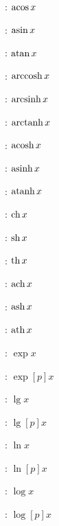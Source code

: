 \documentclass[12pt,a4paper]{article}
\begin{document}
\begin{multicols}{2}
     : $\acos x$

     : $\asin x$

     : $\atan x$

     : $\arccosh x$

     : $\arcsinh x$

     : $\arctanh x$

     : $\acosh x$

     : $\asinh x$

     : $\atanh x$

     : $\fch x$

     : $\fsh x$

     : $\fth x$

     : $\afch x$

     : $\afsh x$

     : $\afth x$

     : $\exp x$

     : $\exp[p] x$

     : $\lg x$

     : $\lg[p] x$

     : $\ln x$

     : $\ln[p] x$

     : $\log x$

     : $\log[p] x$
\end{multicols}
\end{document}
